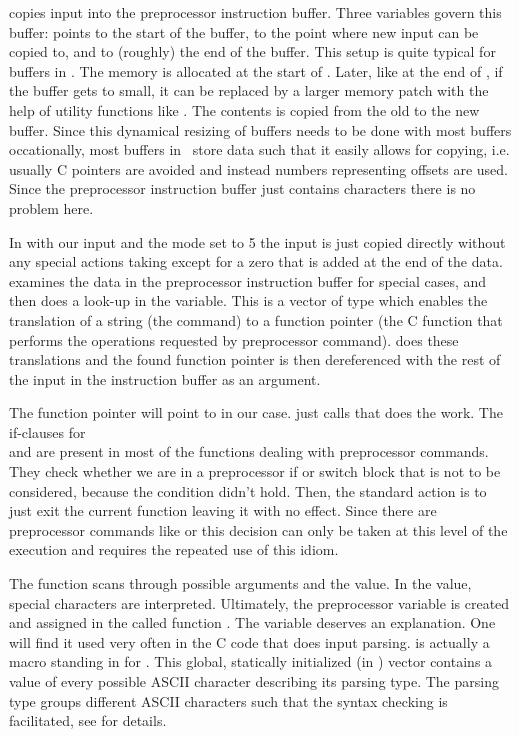  copies input into the preprocessor instruction buffer.
Three variables govern this buffer:  points to the start of the
buffer,  to the point where new input can be copied to, and
 to (roughly) the end of the buffer. This setup is quite typical
for buffers in \FORM. The memory is allocated at the start of \FORM. Later, like
at the end of , if the buffer gets to small, it can be
replaced by a larger memory patch with the help of utility functions like
. The contents is copied from the old to the new buffer. Since
this dynamical resizing of buffers needs to be done with most buffers
occationally, most buffers in \FORM\ store data such that it easily allows for
copying, i.e.  usually C pointers are avoided and instead numbers representing
offsets are used. Since the preprocessor instruction buffer just contains
characters there is no problem here.

In  with our input and the mode set to 5 the input is just
copied directly without any special actions taking except for a zero that is
added at the end of the data.  examines the data in the
preprocessor instruction buffer for special cases, and then does a look-up in
the  variable. This is a vector of type  which enables
the translation of a string (the command) to a function pointer (the C function
that performs the operations requested by preprocessor command).
 does these translations and the found function pointer is then
dereferenced with the rest of the input in the instruction buffer as an argument.

The function pointer will point to  in our case. 
just calls  that does the work. The if-clauses for \\
 and  are present in most of the
functions dealing with preprocessor commands. They check whether we are in a
preprocessor if or switch block that is not to be considered, because the
condition didn't hold. Then, the standard action is to just exit the current
function leaving it with no effect. Since there are preprocessor commands like
 or  this decision can only be taken at this level of the
execution and requires the repeated use of this idiom.

The function scans through possible arguments and the value. In the value, special
characters are interpreted. Ultimately, the preprocessor variable is created and
assigned in the called function . The variable 
deserves an explanation. One will find it used very often in the C code that
does input parsing.  is actually a macro standing in for
. This global, statically initialized (in ) vector
contains a value of every possible ASCII character describing its parsing type.
The parsing type groups different ASCII characters such that the syntax checking
is facilitated, see  for details.

